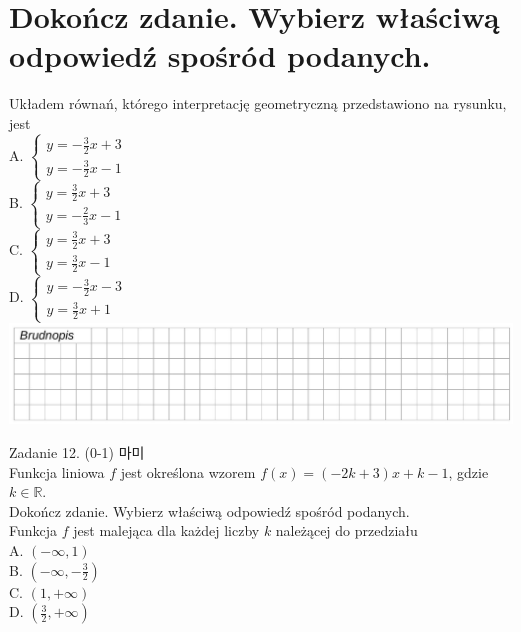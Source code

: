 \documentclass[10pt]{article}
\begin{document}
\section*{Dokończ zdanie. Wybierz właściwą odpowiedź spośród podanych.}
Układem równań, którego interpretację geometryczną przedstawiono na rysunku, jest\\
A. \(\left\{\begin{array}{l}y=-\frac{3}{2} x+3 \\ y=-\frac{3}{2} x-1\end{array}\right.\)\\
B. \(\left\{\begin{array}{l}y=\frac{3}{2} x+3 \\ y=-\frac{2}{3} x-1\end{array}\right.\)\\
C. \(\left\{\begin{array}{l}y=\frac{3}{2} x+3 \\ y=\frac{3}{2} x-1\end{array}\right.\)\\
D. \(\left\{\begin{array}{l}y=-\frac{3}{2} x-3 \\ y=\frac{3}{2} x+1\end{array}\right.\)\\
\includegraphics[max width=\textwidth, center]{2024_11_21_daeb5e5efb43dd4cb535g-11}

Zadanie 12. (0-1) 마미\\
Funkcja liniowa \(f\) jest określona wzorem \(f(x)=(-2 k+3) x+k-1\), gdzie \(k \in \mathbb{R}\).\\
Dokończ zdanie. Wybierz właściwą odpowiedź spośród podanych.\\
Funkcja \(f\) jest malejąca dla każdej liczby \(k\) należącej do przedziału\\
A. \((-\infty, 1)\)\\
B. \(\left(-\infty,-\frac{3}{2}\right)\)\\
C. \((1,+\infty)\)\\
D. \(\left(\frac{3}{2},+\infty\right)\)
\end{document}
